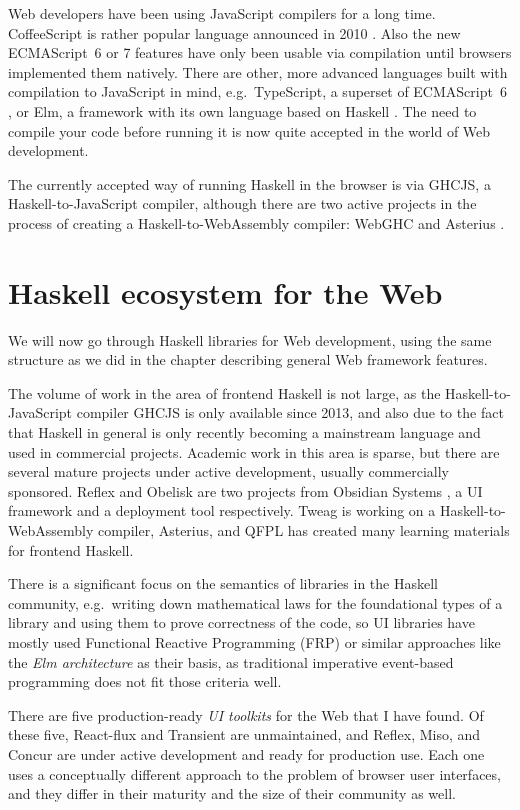 \documentclass[english,zadani,odsaz]{fitthesis}
\begin{document}
Web developers have been using JavaScript compilers for a long time.
CoffeeScript is rather popular language announced in 2010
\cite{coffeescript}. Also the new ECMAScript~6 or 7 features have only been
usable via compilation until browsers implemented them natively. There are
other, more advanced languages built with compilation to JavaScript in mind,
e.g.~TypeScript, a superset of ECMAScript~6 \cite{typescript}, or Elm,
a framework with its own language based on Haskell \cite{czaplicki2012elm}. The
need to compile your code before running it is now quite accepted in the world
of Web development.

The currently accepted way of running Haskell in the browser is via GHCJS, a
Haskell-to-JavaScript compiler, although there are two active projects in the
process of creating a Haskell-to-WebAssembly compiler: WebGHC \cite{webghc} and
Asterius \cite{asterius}.

\section{Haskell ecosystem for the Web}
\label{sec:orgc463d0f}
We will now go through Haskell libraries for Web development, using the same
structure as we did in the chapter describing general Web framework features.

The volume of work in the area of frontend Haskell is not large, as the
Haskell-to-JavaScript compiler GHCJS is only available since 2013, and also due
to the fact that Haskell in general is only recently becoming a mainstream
language and used in commercial projects. Academic work in this area is sparse,
but there are several mature projects under active development, usually
commercially sponsored. Reflex and Obelisk are two projects from Obsidian
Systems \cite{obsidian}, a UI framework and a deployment tool respectively. Tweag
\cite{tweag} is working on a Haskell-to-WebAssembly compiler, Asterius, and QFPL
\cite{qfpl} has created many learning materials for frontend Haskell.

There is a significant focus on the semantics of libraries in the Haskell
community, e.g.~writing down mathematical laws for the foundational types of a
library and using them to prove correctness of the code, so UI libraries have
mostly used Functional Reactive Programming (FRP) or similar approaches like
the \emph{Elm architecture} \cite{loder2018web} as their basis, as traditional
imperative event-based programming does not fit those criteria well.

There are five production-ready \emph{UI toolkits} for the Web that I have found. Of
these five, React-flux and Transient are unmaintained, and Reflex, Miso, and
Concur are under active development and ready for production use. Each one uses
a conceptually different approach to the problem of browser user interfaces, and
they differ in their maturity and the size of their community as well.
\end{document}

